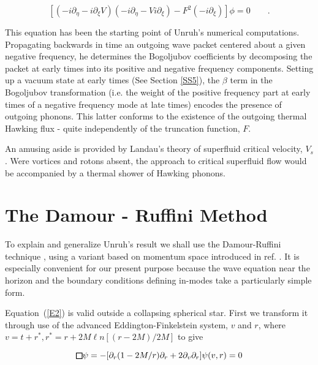 \documentclass[12pt]{article}
\def\sqr#1#2{{\vcenter{\vbox{\hrule height.#2pt
          \hbox{\vrule width.#2pt height#1pt \kern#1pt
           \vrule width.#2pt}
           \hrule height.#2pt}}}}
\def\square{\mathchoice\sqr68\sqr68\sqr{4.2}6\sqr{3}6}
\begin{document}
\begin{equation}
\label{E3}
[ \left( -i\partial_{\eta} - i\partial_{\xi} V \right) \left(
-i\partial_{\eta} - V i\partial_{\xi} \right) - F^2
\left(-i\partial_{\xi}\right) ] \phi = 0 \qquad .
\end{equation}



This equation has been the starting point of Unruh's numerical computations.
Propagating backwards in time an outgoing wave packet centered about a given
negative frequency, he determines the Bogoljubov coefficients by decomposing
the packet at early times into its positive and negative frequency components.
Setting up a vacuum state at early times (See Section \ref{SS5}), the $ \beta$
term in the Bogoljubov transformation (i.e. the weight of the positive
frequency part at early times of a negative frequency mode at late times)
encodes the presence of outgoing phonons. This latter conforms to the
existence of the outgoing thermal Hawking flux - quite independently of the
truncation function, $F$.



An amusing aside is provided by Landau's theory of superfluid critical
velocity, $ V_s$. Were vortices and rotons absent, the approach to critical
superfluid flow would be accompanied by a thermal shower of Hawking phonons.



\section{The Damour - Ruffini Method}\label{SS3}



To explain and generalize Unruh's result we shall use the Damour-Ruffini 
technique \cite{DaRu}, using a
variant based on momentum space introduced in ref. \cite{PaBr0}.
It is especially convenient for our present purpose because the wave equation
near the horizon and the boundary conditions defining in-modes take a
particularly simple form.



Equation~(\ref{E2}) is valid outside a collapsing spherical star. First we
transform it through use of the advanced Eddington-Finkelstein system, $v$
and $r$, where $ v = t + r^*, r^* = r + 2 M\ell n [ (r - 2 M) / 2 M ]$ to give

\begin{equation}
\label{E4}
\square \psi = - [ \partial_ r (1 - 2 M /r) \partial_r + 2
\partial_v \partial_r ] \psi (v,r) = 0
\end{equation}
\end{document}
